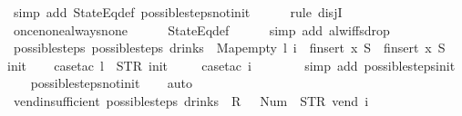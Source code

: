 \begin{isabellebody}
\ {\isacharparenleft}simp\ add{\isacharcolon}\ StateEq{\isacharunderscore}def\ possible{\isacharunderscore}steps{\isacharunderscore}not{\isacharunderscore}init{\isacharparenright}\isanewline
\ \ \ \ \isamarkupfalse%
\ {\isacharparenleft}rule\ disjI{}{\isacharparenright}\isanewline
\ \ \ \ \isamarkupfalse%
\ once{\isacharunderscore}none{\isacharunderscore}always{\isacharunderscore}none\isanewline
\ \ \ \ \isamarkupfalse%
\ StateEq{\isacharunderscore}def\isanewline
\ \ \ \ \isamarkupfalse%
\ {\isacharparenleft}simp\ add{\isacharcolon}\ alw{\isacharunderscore}iff{\isacharunderscore}sdrop{\isacharparenright}\isanewline
{}\isamarkupfalse%
%
\endisatagproof
{\isafoldproof}%
%
\isadelimproof
\isanewline
%
\endisadelimproof
\isanewline
{}\isamarkupfalse%
\ possible{\isacharunderscore}steps{\isacharunderscore}{}{\isacharcolon}\ {\isachardoublequoteopen}possible{\isacharunderscore}steps\ drinks\ {}\ Map{\isachardot}empty\ l\ i\ {\isacharequal}\ finsert\ x\ S{\isacharprime}\ {\isasymLongrightarrow}\ finsert\ x\ S{\isacharprime}\ {\isacharequal}\ {\isacharbraceleft}{\isacharbar}{\isacharparenleft}{}{\isacharcomma}\ init{\isacharparenright}{\isacharbar}{\isacharbraceright}{\isachardoublequoteclose}\isanewline
%
\isadelimproof
\ \ %
\endisadelimproof
%
\isatagproof
{}\isamarkupfalse%
\ {\isacharparenleft}case{\isacharunderscore}tac\ {\isachardoublequoteopen}l\ {\isacharequal}\ STR\ {\isacharprime}{\isacharprime}init{\isacharprime}{\isacharprime}{\isachardoublequoteclose}{\isacharparenright}\isanewline
\ \ \ \isamarkupfalse%
\ {\isacharparenleft}case{\isacharunderscore}tac\ {\isachardoublequoteopen}i\ {\isacharequal}\ {\isacharbrackleft}{\isacharbrackright}{\isachardoublequoteclose}{\isacharparenright}\isanewline
\ \ \ \ \isamarkupfalse%
\ {\isacharparenleft}simp\ add{\isacharcolon}\ possible{\isacharunderscore}steps{\isacharunderscore}init{\isacharparenright}\isanewline
\ \ \isamarkupfalse%
\ possible{\isacharunderscore}steps{\isacharunderscore}not{\isacharunderscore}init\isanewline
\ \ \isamarkupfalse%
\ auto%
\endisatagproof
{\isafoldproof}%
%
\isadelimproof
\isanewline
%
\endisadelimproof
\isanewline
{}\isamarkupfalse%
\ vend{\isacharunderscore}insufficient{\isacharcolon}\ {\isachardoublequoteopen}possible{\isacharunderscore}steps\ drinks\ {}\ {\isacharless}R\ {}\ {\isacharcolon}{\isacharequal}\ Num\ {}{\isachargreater}\ STR\ {\isacharprime}{\isacharprime}vend{\isacharprime}{\isacharprime}\ i\ {\isacharequal}\ {\isacharbraceleft}{\isacharbar}{\isacharbar}{\isacharbraceright}{\isachardoublequoteclose}\isanewline

\end{isabellebody}
